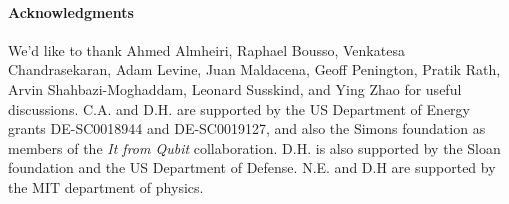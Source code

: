 \documentclass[12pt]{article}
\theoremstyle{definition}
\begin{document}
\paragraph{Acknowledgments}
We'd like to thank Ahmed Almheiri, Raphael Bousso, Venkatesa Chandrasekaran, Adam Levine, Juan Maldacena, Geoff Penington, Pratik Rath, Arvin Shahbazi-Moghaddam, Leonard Susskind, and Ying Zhao for useful discussions. C.A. and D.H. are supported by the US Department of Energy grants DE-SC0018944 and DE-SC0019127, and also the Simons foundation as members of the {\it It from Qubit} collaboration.  D.H. is also supported by the Sloan foundation and the US Department of Defense.  N.E. and D.H are supported by the MIT department of physics.


\end{document}
